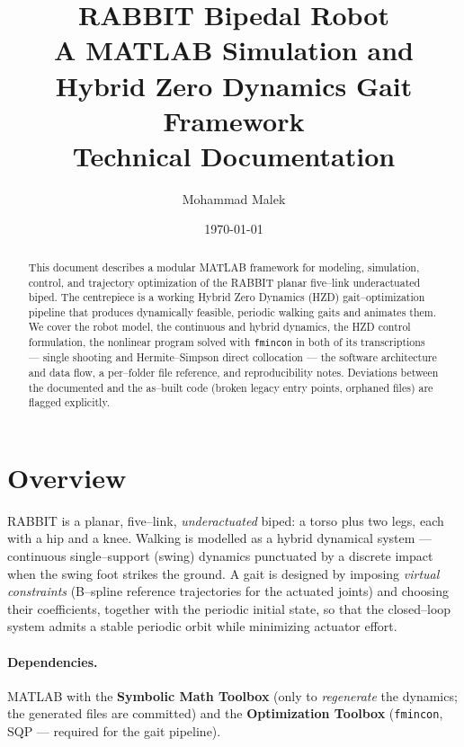 \documentclass[11pt,a4paper]{article}
\title{\textbf{RABBIT Bipedal Robot}\\[2pt]
       \large A MATLAB Simulation and Hybrid Zero Dynamics Gait Framework\\[6pt]
       \normalsize Technical Documentation}
\author{Mohammad Malek}
\date{\today}
\newcommand{\code}[1]{\texttt{#1}}          %
\begin{document}
\maketitle

\begin{abstract}
\noindent
This document describes a modular MATLAB framework for modeling, simulation,
control, and trajectory optimization of the RABBIT planar five--link
underactuated biped. The centrepiece is a working Hybrid Zero Dynamics (HZD)
gait--optimization pipeline that produces dynamically feasible, periodic walking
gaits and animates them. We cover the robot model, the continuous and hybrid
dynamics, the HZD control formulation, the nonlinear program solved with
\code{fmincon} in both of its transcriptions --- single shooting and
Hermite--Simpson direct collocation --- the software architecture and data
flow, a per--folder file reference, and reproducibility notes. Deviations between the documented and the
as--built code (broken legacy entry points, orphaned files) are flagged
explicitly.
\end{abstract}

\bigskip

\section{Overview}
RABBIT is a planar, five--link, \emph{underactuated} biped: a torso plus two
legs, each with a hip and a knee. Walking is modelled as a hybrid dynamical
system --- continuous single--support (swing) dynamics punctuated by a discrete
impact when the swing foot strikes the ground. A gait is designed by imposing
\emph{virtual constraints} (B--spline reference trajectories for the actuated
joints) and choosing their coefficients, together with the periodic initial
state, so that the closed--loop system admits a stable periodic orbit while
minimizing actuator effort.

\paragraph{Dependencies.}
MATLAB with the \textbf{Symbolic Math Toolbox} (only to \emph{regenerate} the
dynamics; the generated files are committed) and the \textbf{Optimization
Toolbox} (\code{fmincon}, SQP --- required for the gait pipeline).
\end{document}
